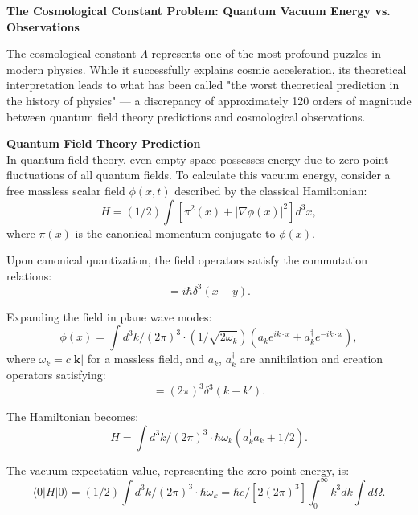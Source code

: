\begin{technical}
{\Large\textbf{The Cosmological Constant Problem: Quantum Vacuum Energy vs. Observations}}

The cosmological constant $\Lambda$ represents one of the most profound puzzles in modern physics. While it successfully explains cosmic acceleration, its theoretical interpretation leads to what has been called "the worst theoretical prediction in the history of physics" — a discrepancy of approximately 120 orders of magnitude between quantum field theory predictions and cosmological observations.

\medskip

\noindent\textbf{Quantum Field Theory Prediction}\\
In quantum field theory, even empty space possesses energy due to zero-point fluctuations of all quantum fields. To calculate this vacuum energy, consider a free massless scalar field $\phi(x,t)$ described by the classical Hamiltonian:
\begin{equation}
H = (1/2) \int \left[ \pi^2(x) + |\nabla \phi(x)|^2 \right] d^3x,
\end{equation}
where $\pi(x)$ is the canonical momentum conjugate to $\phi(x)$.

Upon canonical quantization, the field operators satisfy the commutation relations:
\begin{equation}
[\phi(x), \pi(y)] = i\hbar \delta^3(x - y).
\end{equation}

Expanding the field in plane wave modes:
\begin{equation}
\phi(x) = \int d^3k/(2\pi)^3 \cdot (1/\sqrt{2\omega_k}) \left( a_k e^{ik \cdot x} + a_k^\dagger e^{-ik \cdot x} \right),
\end{equation}
where $\omega_k = c|\mathbf{k}|$ for a massless field, and $a_k$, $a_k^\dagger$ are annihilation and creation operators satisfying:
\begin{equation}
[a_k, a_{k'}^\dagger] = (2\pi)^3 \delta^3(k - k').
\end{equation}

The Hamiltonian becomes:
\begin{equation}
H = \int d^3k/(2\pi)^3 \cdot \hbar\omega_k \left( a_k^\dagger a_k + 1/2 \right).
\end{equation}

The vacuum expectation value, representing the zero-point energy, is:
\begin{equation}
\langle 0 | H | 0 \rangle = (1/2) \int d^3k/(2\pi)^3 \cdot \hbar\omega_k = \hbar c/[2(2\pi)^3] \int_0^\infty k^3 dk \int d\Omega.
\end{equation}


\end{technical}
